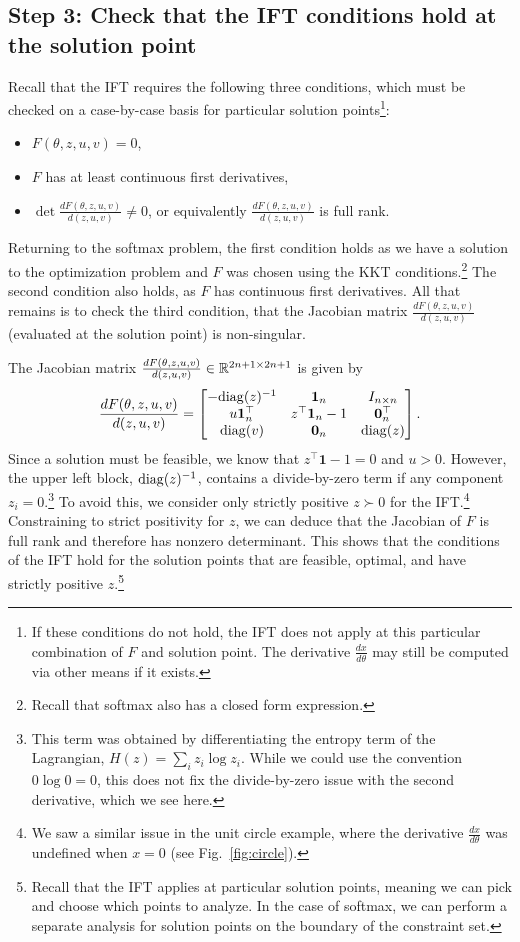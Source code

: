 \documentclass[11pt]{article}
\begin{document}
\subsection*{Step 3: Check that the IFT conditions hold at the solution point}
Recall that the IFT requires the following three conditions,
which must be checked on a case-by-case basis for particular
solution points\footnote{If these conditions do not hold,
the IFT does not apply at this particular combination of $F$ and solution point.
The derivative $\frac{dx}{d\theta}$ may still be computed via other means
if it exists.}:
\begin{itemize}
    \item $F(\theta,z,u,v) = 0$,
    \item $F$ has at least continuous first derivatives,
    \item $\det\frac{dF(\theta,z,u,v)}{d(z,u,v)} \ne 0$,
        or equivalently $\frac{dF(\theta,z,u,v)}{d(z,u,v)}$
        is full rank.
\end{itemize}
Returning to the softmax problem,
the first condition holds as we have a solution to the optimization problem
and $F$ was chosen using the KKT conditions.\footnote{
Recall that softmax also has a closed form expression.}
The second condition also holds, as $F$ has continuous first derivatives.
All that remains is to check the third condition,
that the Jacobian matrix $\frac{dF(\theta,z,u,v)}{d(z,u,v)}$
(evaluated at the solution point) is non-singular.

The Jacobian matrix $\frac{dF(\theta,z,u,v)}{d(z,u,v)}\in\mathbb{R}^{2n+1\times 2n+1}$ is given by
\begin{equation}
\label{eqn:f-jac}
\frac{dF(\theta,z,u,v)}{d(z,u,v)}=
\begin{bmatrix}
-\mathrm{diag}(z)^{-1} & \mathbf{1}_n & I_{n\times n} \\
u\mathbf{1}_n^\top & z^\top\mathbf{1}_n - 1 & \mathbf{0}^\top_n\\
\mathrm{diag}(v) & \mathbf{0}_n & \mathrm{diag}(z)
\end{bmatrix}.
\end{equation}
Since a solution must be feasible, we know that $z^\top\mathbf{1}-1=0$ and $u > 0$.
However, the upper left block, $\mathrm{diag}(z)^{-1}$, contains a divide-by-zero term if
any component $z_i = 0$.\footnote{
This term was obtained by differentiating the entropy
term of the Lagrangian, $H(z) = \sum_i z_i\log z_i$.
While we could use the convention $0\log 0 = 0$,
this does not fix the divide-by-zero issue with the second derivative, which we see here.
}
To avoid this, we consider only strictly positive $z \succ 0$ for the IFT.\footnote{
We saw a similar issue in the unit circle example, where the derivative
$\frac{dx}{d\theta}$ was undefined when $x=0$ (see Fig.~\ref{fig:circle}).
}
Constraining to strict positivity for $z$,
we can deduce that the Jacobian of $F$ is full rank and therefore has nonzero determinant.
This shows that the conditions of the IFT hold for the solution points that are
feasible, optimal, and have strictly positive $z$.\footnote{
Recall that the IFT applies at particular solution points,
meaning we can pick and choose which points to analyze.
In the case of softmax, we can perform a separate analysis
for solution points on the boundary of the constraint set.
}
\end{document}
